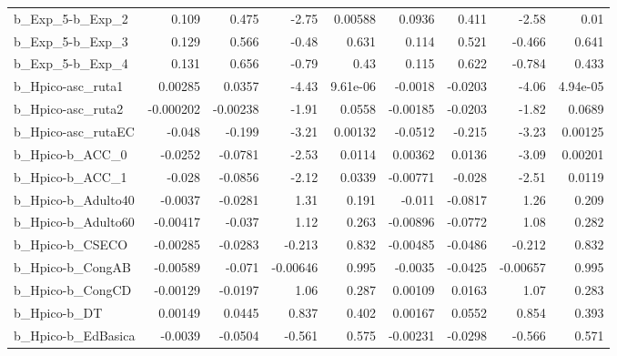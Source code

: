 \begin{tabular}{lrrrrrrrr}
b\_Exp\_5-b\_Exp\_2            &       0.109 &        0.475 &    -2.75 &  0.00588 &     0.0936 &       0.411 &        -2.58 &          0.01 \\
b\_Exp\_5-b\_Exp\_3            &       0.129 &        0.566 &    -0.48 &    0.631 &      0.114 &       0.521 &       -0.466 &         0.641 \\
b\_Exp\_5-b\_Exp\_4            &       0.131 &        0.656 &    -0.79 &     0.43 &      0.115 &       0.622 &       -0.784 &         0.433 \\
b\_Hpico-asc\_ruta1          &     0.00285 &       0.0357 &    -4.43 & 9.61e-06 &    -0.0018 &     -0.0203 &        -4.06 &      4.94e-05 \\
b\_Hpico-asc\_ruta2          &   -0.000202 &     -0.00238 &    -1.91 &   0.0558 &   -0.00185 &     -0.0203 &        -1.82 &        0.0689 \\
b\_Hpico-asc\_rutaEC         &      -0.048 &       -0.199 &    -3.21 &  0.00132 &    -0.0512 &      -0.215 &        -3.23 &       0.00125 \\
b\_Hpico-b\_ACC\_0            &     -0.0252 &      -0.0781 &    -2.53 &   0.0114 &    0.00362 &      0.0136 &        -3.09 &       0.00201 \\
b\_Hpico-b\_ACC\_1            &      -0.028 &      -0.0856 &    -2.12 &   0.0339 &   -0.00771 &      -0.028 &        -2.51 &        0.0119 \\
b\_Hpico-b\_Adulto40         &     -0.0037 &      -0.0281 &     1.31 &    0.191 &     -0.011 &     -0.0817 &         1.26 &         0.209 \\
b\_Hpico-b\_Adulto60         &    -0.00417 &       -0.037 &     1.12 &    0.263 &   -0.00896 &     -0.0772 &         1.08 &         0.282 \\
b\_Hpico-b\_CSECO            &    -0.00285 &      -0.0283 &   -0.213 &    0.832 &   -0.00485 &     -0.0486 &       -0.212 &         0.832 \\
b\_Hpico-b\_CongAB           &    -0.00589 &       -0.071 & -0.00646 &    0.995 &    -0.0035 &     -0.0425 &     -0.00657 &         0.995 \\
b\_Hpico-b\_CongCD           &    -0.00129 &      -0.0197 &     1.06 &    0.287 &    0.00109 &      0.0163 &         1.07 &         0.283 \\
b\_Hpico-b\_DT               &     0.00149 &       0.0445 &    0.837 &    0.402 &    0.00167 &      0.0552 &        0.854 &         0.393 \\
b\_Hpico-b\_EdBasica         &     -0.0039 &      -0.0504 &   -0.561 &    0.575 &   -0.00231 &     -0.0298 &       -0.566 &         0.571 \\

\end{tabular}
